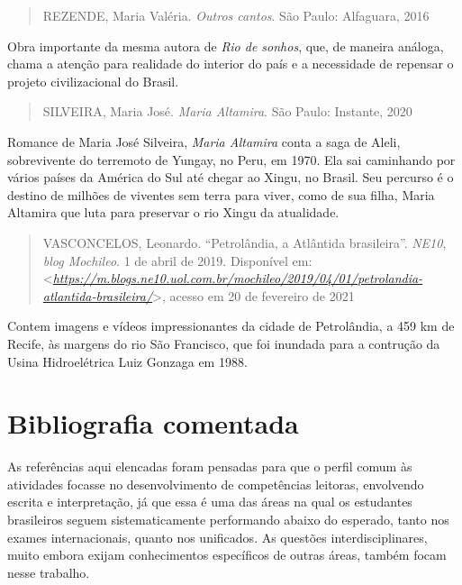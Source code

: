 \documentclass{extrarticle}
\begin{document}
    \begin{quote}
    REZENDE, Maria Valéria. \emph{Outros cantos}. São Paulo: Alfaguara,
    2016
    \end{quote}

    Obra importante da mesma autora de \emph{Rio de sonhos}, que, de
    maneira análoga, chama a atenção para realidade do interior do país
    e a necessidade de repensar o projeto civilizacional do Brasil.

    \begin{quote}
    SILVEIRA, Maria José. \emph{Maria Altamira}. São Paulo: Instante,
    2020
    \end{quote}

    Romance de Maria José Silveira, \emph{Maria Altamira} conta a saga
    de Aleli, sobrevivente do terremoto de Yungay, no Peru, em 1970. Ela
    sai caminhando por vários países da América do Sul até chegar ao
    Xingu, no Brasil. Seu percurso é o destino de milhões de viventes
    sem terra para viver, como de sua filha, Maria Altamira que luta
    para preservar o rio Xingu da atualidade.

    \begin{quote}
    VASCONCELOS, Leonardo. ``Petrolândia, a Atlântida brasileira''.
    \emph{NE10}, \emph{blog Mochileo}. 1 de abril de 2019. Disponível
    em:
    \textless{}\href{https://m.blogs.ne10.uol.com.br/mochileo/2019/04/01/petrolandia-atlantida-brasileira/}{\emph{https://m.blogs.ne10.uol.com.br/mochileo/2019/04/01/petrolandia-atlantida-brasileira/}}\textgreater{},
    acesso em 20 de fevereiro de 2021
    \end{quote}

    Contem imagens e vídeos impressionantes da cidade de Petrolândia, a
    459 km de Recife, às margens do rio São Francisco, que foi inundada
    para a contrução da Usina Hidroelétrica Luiz Gonzaga em 1988.


\section{Bibliografia comentada}

    As referências aqui elencadas foram pensadas para que o perfil comum
    às atividades focasse no desenvolvimento de competências leitoras,
    envolvendo escrita e interpretação, já que essa é uma das áreas na
    qual os estudantes brasileiros seguem sistematicamente performando
    abaixo do esperado, tanto nos exames internacionais, quanto nos
    unificados. As questões interdisciplinares, muito embora exijam
    conhecimentos específicos de outras áreas, também focam nesse
    trabalho.
\end{document}
